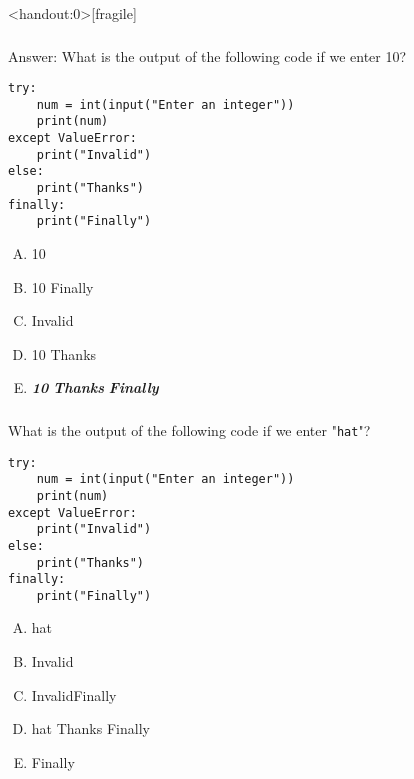 \documentclass[xcolor=svgnames]{beamer}
\newcommand{\answer}[1]{\textit{\textbf{\textcolor{iyellow}{#1}}}}
\newcommand{\ft}[1]{\frametitle{#1}}
\begin{document}
\begin{frame}<handout:0>[fragile]\ft{}
  \begin{block}{Answer:}
  What is the output of the following code if we enter 10?
\begin{Verbatim}
try:
    num = int(input("Enter an integer"))
    print(num)
except ValueError:
    print("Invalid")
else:
    print("Thanks")
finally:
    print("Finally")
\end{Verbatim}
\begin{multicols}{5}
\begin{enumerate}[A)]
\item 10 \newline\newline
\item 10 \newline Finally \newline
\item Invalid\newline\newline
\item 10 \newline Thanks \newline
\item \answer{10} \newline \answer{Thanks} \newline \answer{Finally}
\end{enumerate}
\end{multicols}
  \end{block} 
\end{frame}




\begin{frame}[fragile]\ft{}
  \begin{example}
  What is the output of the following code if we enter "{\tt hat}"?
\begin{Verbatim}
try:
    num = int(input("Enter an integer"))
    print(num)
except ValueError:
    print("Invalid")
else:
    print("Thanks")
finally:
    print("Finally")
\end{Verbatim}
\begin{multicols}{5}
\begin{enumerate}[A)]
\item hat \newline\newline
\item Invalid\newline  \newline
\item Invalid\newline Finally \newline
\item hat \newline Thanks \newline Finally
\item Finally \newline  \newline 
\end{enumerate}
\end{multicols}
  \end{example} 
\end{frame}
\end{document}

